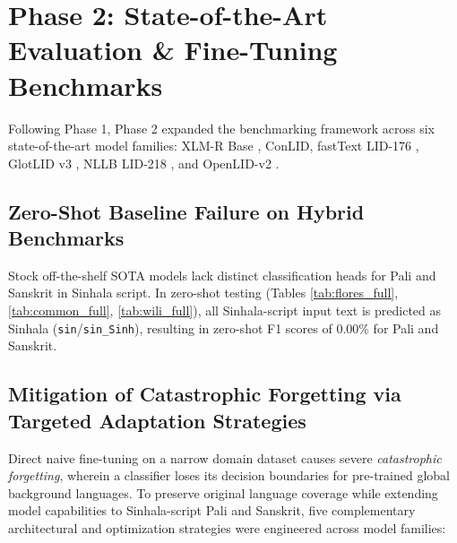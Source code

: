 \documentclass[conference]{IEEEtran}
\begin{document}
\section{Phase 2: State-of-the-Art Evaluation \& Fine-Tuning Benchmarks}

Following Phase 1, Phase 2 expanded the benchmarking framework across six state-of-the-art model families: XLM-R Base \cite{b2}, ConLID, fastText LID-176 \cite{b1}, GlotLID v3 \cite{b4}, NLLB LID-218 \cite{b12}, and OpenLID-v2 \cite{b13}.

\subsection{Zero-Shot Baseline Failure on Hybrid Benchmarks}
Stock off-the-shelf SOTA models lack distinct classification heads for Pali and Sanskrit in Sinhala script. In zero-shot testing (Tables \ref{tab:flores_full}, \ref{tab:common_full}, \ref{tab:wili_full}), all Sinhala-script input text is predicted as Sinhala (\texttt{sin}/\texttt{sin\_Sinh}), resulting in zero-shot F1 scores of 0.00\% for Pali and Sanskrit.

\subsection{Mitigation of Catastrophic Forgetting via Targeted Adaptation Strategies}
Direct naive fine-tuning on a narrow domain dataset causes severe \textit{catastrophic forgetting}, wherein a classifier loses its decision boundaries for pre-trained global background languages. To preserve original language coverage while extending model capabilities to Sinhala-script Pali and Sanskrit, five complementary architectural and optimization strategies were engineered across model families:
\end{document}
